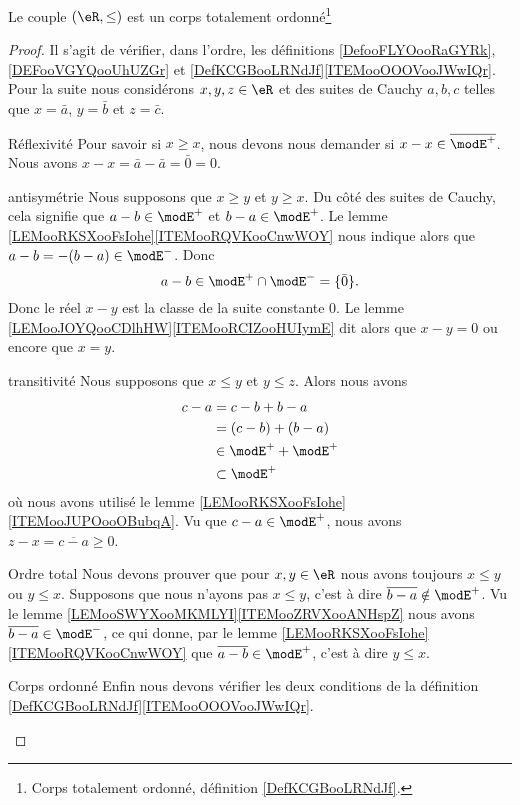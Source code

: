 \begin{proposition} \label{PROPooYMJVooNAsXae}  
    Le couple \( (\eR,\leq)\) est un corps totalement ordonné\footnote{Corps totalement ordonné, définition \ref{DefKCGBooLRNdJf}.}
\end{proposition}

\begin{proof}
    Il s'agit de vérifier, dans l'ordre, les définitions \ref{DefooFLYOooRaGYRk}, \ref{DEFooVGYQooUhUZGr} et \ref{DefKCGBooLRNdJf}\ref{ITEMooOOOVooJWwIQr}. Pour la suite nous considérons \( x,y,z\in \eR\) et des suites de Cauchy \( a,b,c\) telles que \( x=\bar a\), \( y=\bar b\) et \( z=\bar c\).
    \begin{subproof}
    \item[Réflexivité]
        Pour savoir si \( x\geq x\), nous devons nous demander si \( x-x\in\overline{ \modE^+ }\). Nous avons \( x-x=\bar a-\bar a=\bar 0=0\).
    \item[antisymétrie]
        Nous supposons que \( x\geq y\) et \( y\geq x\). Du côté des suites de Cauchy, cela signifie que \( a-b\in\modE^+\) et \( b-a\in \modE^+\). Le lemme \ref{LEMooRKSXooFsIohe}\ref{ITEMooRQVKooCnwWOY} nous indique alors que \( a-b=-(b-a)\in \modE^-\). Donc
        \begin{equation}
            a-b\in\modE^+\cap\modE^-=\{ \bar 0 \}.
        \end{equation}
        Donc le réel \( x-y\) est la classe de la suite constante \( 0\). Le lemme \ref{LEMooJOYQooCDlhHW}\ref{ITEMooRCIZooHUIymE} dit alors que \( x-y=0\) ou encore que \( x=y\).
    \item[transitivité]
        Nous supposons que \( x\leq y\) et \( y\leq z\). Alors nous avons
        \begin{subequations}
            \begin{align}
                c-a&=c-b+b-a\\
                &=(c-b)+(b-a)\\
                &\in \modE^++\modE^+\\
                &\subset \modE^+
            \end{align}
        \end{subequations}
        où nous avons utilisé le lemme \ref{LEMooRKSXooFsIohe}\ref{ITEMooJUPOooOBubqA}. Vu que \( c-a\in\modE^+\), nous avons \( z-x=\overline{ c-a }\geq 0\).
    \item[Ordre total]
        Nous devons prouver que pour \( x,y\in \eR\) nous avons toujours \( x\leq y\) ou \( y\leq x\). Supposons que nous n'ayons pas \( x\leq y\), c'est à dire \( \overline{ b-a }\notin \modE^+\). Vu le lemme \ref{LEMooSWYXooMKMLYI}\ref{ITEMooZRVXooANHspZ} nous avons \( \overline{ b-a }\in \modE^-\), ce qui donne, par le lemme \ref{LEMooRKSXooFsIohe}\ref{ITEMooRQVKooCnwWOY} que \( \overline{ a-b }\in \modE^+\), c'est à dire \( y\leq x\).
    \item[Corps ordonné]
        Enfin nous devons vérifier les deux conditions de la définition \ref{DefKCGBooLRNdJf}\ref{ITEMooOOOVooJWwIQr}.


\end{subproof}
\end{proof}
